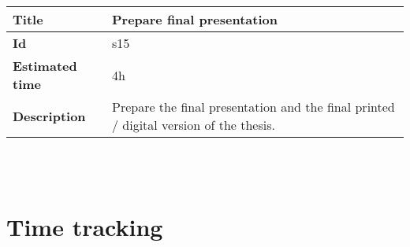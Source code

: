     \begin{tabular}{ | p{4cm} | p{10cm} |}
    \hline
    \textbf{Title} & Prepare final presentation\\ \hline
    \textbf{Id} & s15\\ \hline
    \textbf{Estimated time} & 4h \\ \hline
    \textbf{Description} &  Prepare the final presentation and the final printed / digital version of the thesis.  \\ 
    \hline
    \end{tabular} \\\\


\section{Time tracking}
    \label{sec:Time tracking}










